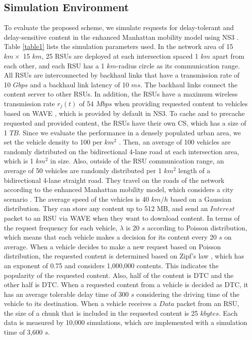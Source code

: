 \documentclass{ieeeaccess}
\begin{document}
\subsection{Simulation Environment} \label{sec.s1}
To evaluate the proposed scheme, we simulate requests for delay-tolerant and delay-sensitive content in the enhanced Manhattan mobility model using NS3 \cite{NS3}.
Table \ref{table1} lists the simulation parameters used.
In the network area of 15 $km \times$ 15 $km$, 25 RSUs are deployed at each intersection spaced 1 $km$ apart from each other, and each RSU has a 1 $km$-radius circle as its communication range.
All RSUs are interconnected by backhaul links that have a transmission rate of 10 $Gbps$ and a backhaul link latency of 10 $ms$.
The backhaul links connect the content server to other RSUs.
In addition, the RSUs have a maximum wireless transmission rate $r_{j}(t)$ of 54 $Mbps$ when providing requested content to vehicles based on WAVE \cite{WAVE}, which is provided by default in NS3.
To cache and to precache requested and provided content, the RSUs have their own CS, which has a size of 1 $TB$.
Since we evaluate the performance in a densely populated urban area, we set the vehicle density to 100 per $km^{2}$ \cite{Sanguesa2013, Mangharam2006}.
Then, an average of 100 vehicles are randomly distributed on the bidirectional 4-lane road at each intersection area, which is 1 $km^{2}$ in size.
Also, outside of the RSU communication range, an average of 50 vehicles are randomly distributed per 1 $km^{2}$ length of a bidirectional 4-lane straight road.
They travel on the roads of the network according to the enhanced Manhattan mobility model, which considers a city scenario \cite{Manhattan}.
The average speed of the vehicles is 40 $km/h$ based on a Gaussian distribution.
They can store any content up to 512 MB, and send an $Interest$ packet to an RSU via WAVE when they want to download content.
In terms of the request frequency for each vehicle, $\lambda$ is 20 $s$ according to Poisson distribution, which means that each vehicle makes a decision for its content every 20 $s$ on average.
When a vehicle decides to make a new request based on Poisson distribution, the requested content is determined based on Zipf's law \cite{Zipf}, which has an exponent of 0.75 and considers 1,000,000 contents.
This indicates the popularity of the requested content.
Also, half of the content is DTC and the other half is DTC.
When a requested content from a vehicle is decided as DTC, it has an average tolerable delay time of 300 $s$ considering the driving time of the vehicle to its destination.
When a vehicle receives a $Data$ packet from an RSU, the size of a chunk that is included in the requested content is 25 $kbytes$.
Each data is measured by 10,000 simulations, which are implemented with a simulation time of 3,600 $s$.
\end{document}
